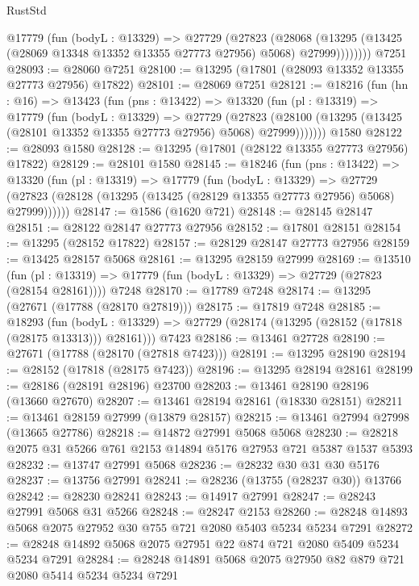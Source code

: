 \begin{lexlean}{RustStd}
\begin{coremodule}
          @17779
            (fun (bodyL : @13329) =>
            @27729
              (@27823
                (@28068
                  (@13295 (@13425 (@28069 @13348 @13352 @13355 @27773 @27956) @5068) @27999))))))))
    @7251
@28093 := @28060 @7251
@28100 := @13295 (@17801 (@28093 @13352 @13355 @27773 @27956) @17822)
@28101 := @28069 @7251
@28121 := @18216
    (fun (hn : @16) =>
    @13423
      (fun (pns : @13422) =>
      @13320
        (fun (pl : @13319) =>
        @17779
          (fun (bodyL : @13329) =>
          @27729
            (@27823
              (@28100 (@13295 (@13425 (@28101 @13352 @13355 @27773 @27956) @5068) @27999)))))))
    @1580
@28122 := @28093 @1580
@28128 := @13295 (@17801 (@28122 @13355 @27773 @27956) @17822)
@28129 := @28101 @1580
@28145 := @18246
    (fun (pns : @13422) =>
    @13320
      (fun (pl : @13319) =>
      @17779
        (fun (bodyL : @13329) =>
        @27729 (@27823 (@28128 (@13295 (@13425 (@28129 @13355 @27773 @27956) @5068) @27999))))))
@28147 := @1586 (@1620 @721)
@28148 := @28145 @28147
@28151 := @28122 @28147 @27773 @27956
@28152 := @17801 @28151
@28154 := @13295 (@28152 @17822)
@28157 := @28129 @28147 @27773 @27956
@28159 := @13425 @28157 @5068
@28161 := @13295 @28159 @27999
@28169 := @13510
    (fun (pl : @13319) => @17779 (fun (bodyL : @13329) => @27729 (@27823 (@28154 @28161))))
    @7248
@28170 := @17789 @7248
@28174 := @13295 (@27671 (@17788 (@28170 @27819)))
@28175 := @17819 @7248
@28185 := @18293
    (fun (bodyL : @13329) => @27729 (@28174 (@13295 (@28152 (@17818 (@28175 @13313))) @28161)))
    @7423
@28186 := @13461 @27728
@28190 := @27671 (@17788 (@28170 (@27818 @7423)))
@28191 := @13295 @28190
@28194 := @28152 (@17818 (@28175 @7423))
@28196 := @13295 @28194 @28161
@28199 := @28186 (@28191 @28196) @23700
@28203 := @13461 @28190 @28196 (@13660 @27670)
@28207 := @13461 @28194 @28161 (@18330 @28151)
@28211 := @13461 @28159 @27999 (@13879 @28157)
@28215 := @13461 @27994 @27998 (@13665 @27786)
@28218 := @14872 @27991 @5068 @5068
@28230 := @28218 @2075 @31 @5266 @761 @2153 @14894 @5176 @27953 @721 @5387 @1537 @5393
@28232 := @13747 @27991 @5068
@28236 := @28232 @30 @31 @30 @5176
@28237 := @13756 @27991
@28241 := @28236 (@13755 (@28237 @30)) @13766
@28242 := @28230 @28241
@28243 := @14917 @27991
@28247 := @28243 @27991 @5068 @31 @5266
@28248 := @28247 @2153
@28260 := @28248 @14893 @5068 @2075 @27952 @30 @755 @721 @2080 @5403 @5234 @5234 @7291
@28272 := @28248 @14892 @5068 @2075 @27951 @22 @874 @721 @2080 @5409 @5234 @5234 @7291
@28284 := @28248 @14891 @5068 @2075 @27950 @82 @879 @721 @2080 @5414 @5234 @5234 @7291

\end{coremodule}
\end{lexlean}
